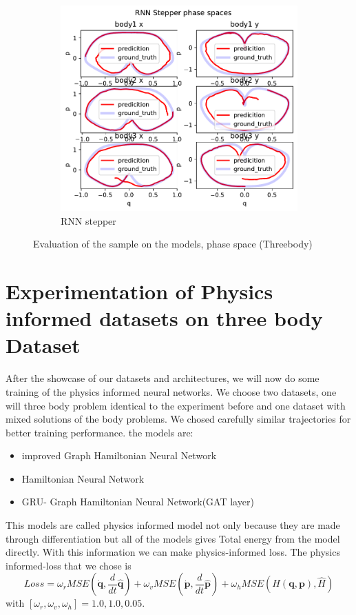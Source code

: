 \begin{figure}[H]
	\hfill
	\begin{subfigure}[b]{0.3\textwidth}
		\centering
		\includegraphics[width=\textwidth]{chapters/chapter5/body3_rne_ps.pdf}
		\caption{RNN stepper}
	\end{subfigure}
	
	\caption{Evaluation of the sample on the models, phase space (Threebody)}
\end{figure} 




\section{Experimentation of Physics informed datasets on three body Dataset}
After the showcase of our datasets and architectures, we will now do some training of the physics informed neural networks. We choose two datasets, one will three body problem identical to the experiment before and one dataset with mixed solutions of the body problems. We chosed carefully similar trajectories for better training performance. 
the models are:
\begin{itemize}
	\item improved Graph Hamiltonian Neural Network
	\item Hamiltonian Neural Network
	\item GRU- Graph Hamiltonian Neural Network(GAT layer)
\end{itemize}
This models are called physics informed model not only because they are made through differentiation but all of the models gives Total energy from the model directly. With this information we can make physics-informed loss. 
The physics informed-loss that we chose is
\begin{equation}
	Loss =  \omega_rMSE(\dot{\mathbf{q}},\frac{d}{dt}\hat{\mathbf{q}}) + \omega_v MSE(\dot{\mathbf{p}},\frac{d}{dt}\hat{\mathbf{p}}) +
	\omega_h MSE(H(\mathbf{q},\mathbf{p}),\hat{H}) 
\end{equation} with $[\omega_r,\omega_v,\omega_h] =1.0,1.0,0.05$.

